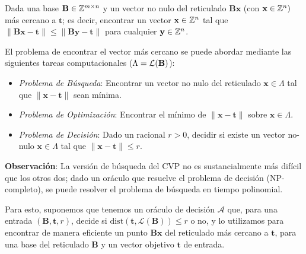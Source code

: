 \begin{frame}
\begin{definition}
Dada una base $\mathbf{B} \in \mathbb{Z}^{m \times n}$ y un vector no nulo del reticulado $\mathbf{Bx}$ (con $\mathbf{x} \in \mathbb{Z}^n)$ más cercano a $\mathbf{t}$; es decir, encontrar un vector $\mathbf{x} \in \mathbb{Z}^n$ tal que $\|\mathbf{Bx} - \mathbf{t}\| \leq \|\mathbf{By} - \mathbf{t}\|$ para cualquier $\mathbf{y} \in \mathbb{Z}^n$.
\end{definition}

El problema de encontrar el vector más cercano se puede abordar mediante las siguientes tareas computacionales ($\Lambda = \mathcal{L}(\mathbf{B})$):
\begin{itemize}
    \item \textit{Problema de Búsqueda}: Encontrar un vector no nulo del reticulado $\mathbf{x} \in \Lambda$ tal que $\|\mathbf{x}-\mathbf{t}\|$ sean mínima.
    \item \textit{Problema de Optimización}: Encontrar el mínimo de $\|\mathbf{x}-\mathbf{t}\|$ sobre $\mathbf{x} \in \Lambda$.
    \item \textit{Problema de Decisión}: Dado un racional $r>0$, decidir si existe un vector no-nulo $\mathbf{x} \in \Lambda$ tal que $\|\mathbf{x}-\mathbf{t}\| \leq r$.
\end{itemize}
\end{frame}

\begin{frame}
\textbf{Observación}: La versión de búsqueda del CVP no es sustancialmente más difícil que los otros dos; dado un oráculo que resuelve el problema de decisión (NP-completo), se puede resolver el problema de búsqueda en tiempo polinomial.

Para esto, suponemos que tenemos un oráculo de decisión $\mathcal{A}$ que, para una entrada $(\mathbf{B},\mathbf{t},r)$, decide si $\mathrm{dist}(\mathbf{t}, \mathcal{L}(\mathbf{B})) \leq r$ o no, y lo utilizamos para encontrar de manera eficiente un punto $\mathbf{Bx}$ del reticulado más cercano a $\mathbf{t}$, para una base del reticulado $\mathbf{B}$ y un vector objetivo $\mathbf{t}$ de entrada.
\end{frame}

